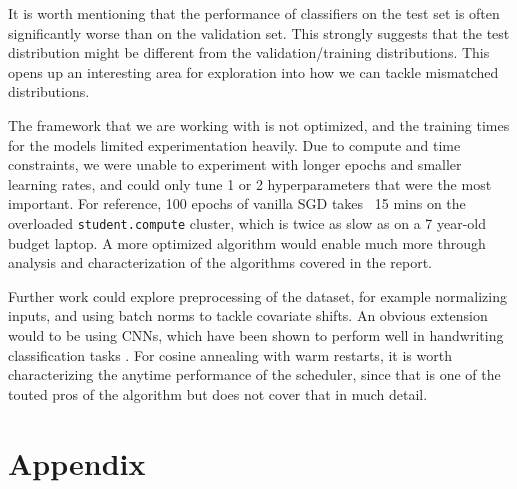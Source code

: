 \documentclass{article}
\begin{document}
It is worth mentioning that the performance of classifiers on the test set is often significantly worse than on the validation set. This strongly suggests that the test distribution might be different from the validation/training distributions\cite{storkey2009training}. This opens up an interesting area for exploration into how we can tackle mismatched distributions\cite{gonzalez2014four}.

The framework that we are working with is not optimized, and the training times for the models limited experimentation heavily. Due to compute and time constraints, we were unable to experiment with longer epochs and smaller learning rates, and could only tune 1 or 2 hyperparameters that were the most important. For reference, 100 epochs of vanilla SGD takes ~15 mins on the overloaded \texttt{student.compute} cluster, which is twice as slow as on a 7 year-old budget laptop. A more optimized algorithm would enable much more through analysis and characterization of the algorithms covered in the report.

Further work could explore preprocessing of the dataset, for example normalizing inputs, and using batch norms to tackle covariate shifts. An obvious extension would to be using CNNs, which have been shown to perform well in handwriting classification tasks \cite{bottou1994comparison}. For cosine annealing with warm restarts, it is worth characterizing the anytime performance of the scheduler, since that is one of the touted pros of the algorithm but \citet{loshchilov2016sgdr} does not cover that in much detail.



\section{Appendix}
\end{document}

